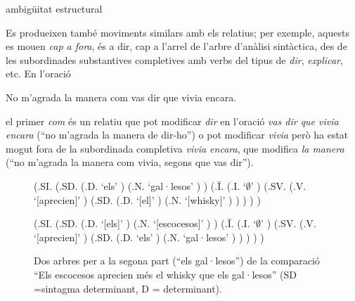 \begin{persabermes}{ambigüitat estructural}
\begin{enumerate}
  Es produeixen també moviments similars amb els relatius; per
  exemple, aquests es mouen \emph{cap a fora}, és a dir, cap a l'arrel
  de l'arbre d'anàlisi sintàctica, des de les subordinades
  substantives completives amb verbs del tipus de {\em dir},
  \emph{explicar}, etc. En l'oració
  \begin{example}
    No m'agrada la manera com vas dir que vivia encara.
  \end{example}
  el primer \emph{com} és un relatiu que pot modificar \emph{dir} en
  l'oració \emph{vas dir que vivia encara} (``no m'agrada la manera de
  dir-ho'') o pot modificar {\em vivia} però ha estat mogut fora de la
  subordinada completiva \emph{vivia encara}, que modifica {\em la
    manera} (``no m'agrada la manera com vivia, segons que vas dir'').
\end{enumerate}
\end{persabermes}

\begin{figure}
\begin{center}
\begin{parsetree}
(.SI. (.SD. (.D. `els' ) (.N. `gal·lesos' ) ) (.{\={I}}. (.I.  `$\emptyset$' )
(.SV. (.V. `[aprecien]' ) (.SD. (.D. `[el]' ) (.N. `[whisky]' ) ) ) ) )
\end{parsetree}
\end{center}
\begin{center}
\begin{parsetree}
(.SI. (.SD. (.D. `[els]' ) (.N. `[escocesos]' ) ) (.{\={I}}. (.I. `$\emptyset$' )
(.SV. (.V. `[aprecien]' ) (.SD. (.D. `els' ) (.N. `gal·lesos' ) ) ) ) )
\end{parsetree}
\end{center}
\caption{Dos arbres per a la segona part (``els gal·lesos'') de la
  comparació ``Els escocesos aprecien més el whisky que els
  gal·lesos'' (SD =sintagma determinant, D = determinant).}
\label{fg:whisky}
\end{figure}

